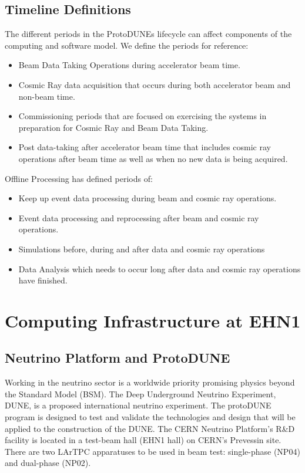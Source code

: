 \documentclass[12pt]{article}
\begin{document}
\subsection{Timeline Definitions}

The different periods in the ProtoDUNEs lifecycle can affect components of the computing and software model. We define the periods for reference:

\begin{itemize}
\item  Beam Data Taking Operations during accelerator beam time.
\item  Cosmic Ray data acquisition that occurs during both accelerator beam and non-beam time.
\item Commissioning periods that are focused on exercising the systems in preparation for Cosmic Ray and Beam Data Taking.
\item Post data-taking after accelerator beam time that includes cosmic ray operations after beam time as well as when no new data is being acquired. 
\end{itemize}

Offline Processing has defined periods of:
\begin {itemize} 
\item Keep up event data processing during beam and cosmic ray operations. 
\item Event data processing and reprocessing after beam and cosmic ray operations.
\item Simulations before, during and after data and cosmic ray operations
\item Data Analysis which needs to occur long after data and cosmic ray operations have finished.
\end{itemize}

\section{Computing Infrastructure at EHN1}
\subsection{Neutrino Platform and ProtoDUNE} 
Working in the neutrino sector is a worldwide priority promising physics beyond the Standard Model (BSM). 
The Deep Underground Neutrino Experiment, DUNE, is a proposed international neutrino experiment. 
The protoDUNE program is designed to test and validate the technologies and design that will be applied to the construction of the DUNE. The CERN Neutrino Platform's R&D facility is located in a test-beam hall (EHN1 hall) on CERN's Prevessin site.
There are two LArTPC apparatuses to be used in beam test: single-phase (NP04) and dual-phase (NP02).
\end{document}
